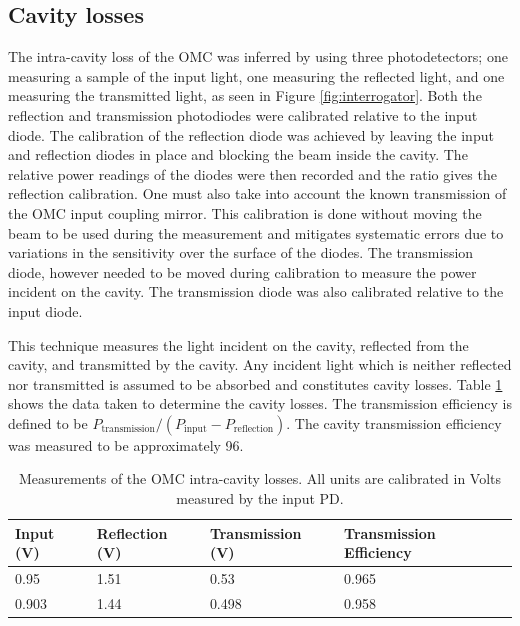 \subsection{Cavity losses}
\label{sec:omclosses}
The intra-cavity loss of the OMC was inferred by using three photodetectors; one measuring a sample of the input light, one measuring the reflected light, and one measuring the transmitted light, as seen in Figure \ref{fig:interrogator}. %
Both the reflection and transmission photodiodes were calibrated relative to the input diode. %
The calibration of the reflection diode was achieved by leaving the input and reflection diodes in place and blocking the beam inside the cavity. %
The relative power readings of the diodes were then recorded and the ratio gives the reflection calibration. %
One must also take into account the known transmission of the OMC input coupling mirror. %
This calibration is done without moving the beam to be used during the measurement and mitigates systematic errors due to variations in the sensitivity over the surface of the diodes. %
The transmission diode, however needed to be moved during calibration to measure the power incident on the cavity. %
The transmission diode was also calibrated relative to the input diode.

This technique measures the light incident on the cavity, reflected from the cavity, and transmitted by the cavity. %
Any incident light which is neither reflected nor transmitted is assumed to be absorbed and constitutes cavity losses. %
Table \ref{tab:lossmeas} shows the data taken to determine the cavity losses. %
The transmission efficiency is defined to be $P_{\text{transmission}}/(P_{\text{input}}-P_{\text{reflection}})$. %
The cavity transmission efficiency was measured to be approximately 96\perc{}.

\begin{table}
  \begin{center}
    \begin{tabular}{lll|l}
      \hline
      Input (V) & Reflection (V) & Transmission (V) & Transmission Efficiency \\
      \hline
      0.95 & 1.51 & 0.53 & 0.965 \\
      0.903 & 1.44 &0.498 & 0.958\\
      \hline
    \end{tabular}
  \caption[Measurements of the OMC intra-cavity losses.]{Measurements of the OMC intra-cavity losses. All units are calibrated in Volts measured by the input PD.}
  \label{tab:lossmeas}
  \end{center}
\end{table}

